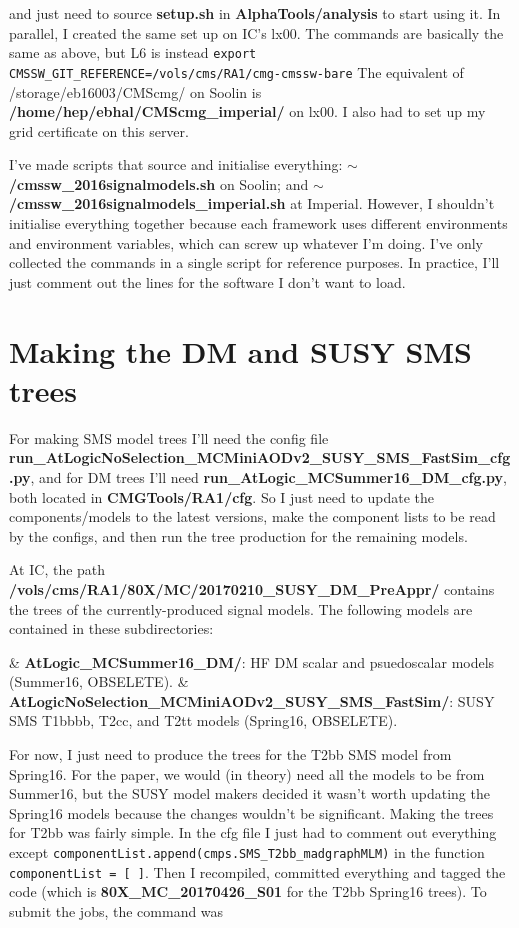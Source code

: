 and just need to source \textbf{setup.sh} in \textbf{AlphaTools/analysis} to start using it. In parallel, I created the same set up on IC's lx00. The commands are basically the same as above, but L6 is instead \texttt{export CMSSW\_GIT\_REFERENCE=/vols/cms/RA1/cmg-cmssw-bare} The equivalent of /storage/eb16003/CMScmg/ on Soolin is \textbf{/home/hep/ebhal/CMScmg\_imperial/} on lx00. I also had to set up my grid certificate on this server.

I've made scripts that source and initialise everything: \textbf{$\sim$/cmssw\_2016signalmodels.sh} on Soolin; and \textbf{$\sim$/cmssw\_2016signalmodels\_imperial.sh} at Imperial. However, I shouldn't initialise everything together because each framework uses different environments and environment variables, which can screw up whatever I'm doing. I've only collected the commands in a single script for reference purposes. In practice, I'll just comment out the lines for the software I don't want to load.


\section{Making the DM and SUSY SMS trees}

For making SMS model trees I'll need the config file \textbf{run\_AtLogicNoSelection\_MCMiniAODv2\_SUSY\_SMS\_FastSim\_cfg.py}, and for DM trees I'll need \textbf{run\_AtLogic\_MCSummer16\_DM\_cfg.py}, both located in \textbf{CMGTools/RA1/cfg}. So I just need to update the components/models to the latest versions, make the component lists to be read by the configs, and then run the tree production for the remaining models.

At IC, the path \textbf{/vols/cms/RA1/80X/MC/20170210\_SUSY\_DM\_PreAppr/} contains the trees of the currently-produced signal models. The following models are contained in these subdirectories:

\begin{easylist}
\easylistprops
& \textbf{AtLogic\_MCSummer16\_DM/}: HF DM scalar and psuedoscalar models (Summer16, OBSELETE).
& \textbf{AtLogicNoSelection\_MCMiniAODv2\_SUSY\_SMS\_FastSim/}: SUSY SMS T1bbbb, T2cc, and T2tt models (Spring16, OBSELETE).
\end{easylist}

For now, I just need to produce the trees for the T2bb SMS model from Spring16. For the paper, we would (in theory) need all the models to be from Summer16, but the SUSY model makers decided it wasn't worth updating the Spring16 models because the changes wouldn't be significant. Making the trees for T2bb was fairly simple. In the cfg file I just had to comment out everything except \texttt{componentList.append(cmps.SMS\_T2bb\_madgraphMLM)} in the function \texttt{componentList = [ ]}. Then I recompiled, committed everything and tagged the code (which is \textbf{80X\_MC\_20170426\_S01} for the T2bb Spring16 trees). To submit the jobs, the command was

